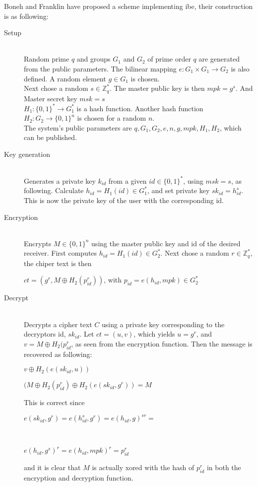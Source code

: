 Boneh and Franklin \cite{DBLP:ibe} have proposed a scheme implementing \gls{ibe}, their construction is as following:
\begin{description}
\item[ Setup ]\hfill \\  
Random prime $q$ and groups $G_1$ and $G_2$ of prime order $q$ are generated from the public parameters. The bilinear mapping $e: G_1 \times G_1 \rightarrow G_2$ is also defined. A random element $g \in G_1$ is chosen.\\
Next chose a random $s \in \mathbb{Z}_q^*$. The master public key is then $mpk = g^s$. And Master secret key $msk = s$\\
$H_1 : \{0,1\}^* \rightarrow G_1^*$ is a hash function. Another hash function $H_2 : G_2 \rightarrow \{0,1\}^n$ is chosen for a random $n$.\\
The system's public parameters are $q,G_1,G_2,e,n,g,mpk,H_1,H_2$, which can be published.
\item[Key generation]\hfill \\
Generates a private key $k_{id}$ from a given $id \in \{0,1\}^*$, using $msk = s$, as following. Calculate $h_{id} = H_1(id) \in G_1^*$, and set private key $sk_{id} = h_{id}^s$. This is now the private key of the user with the corresponding id.
\item[Encryption]\hfill \\
Encrypts $M \in \{0,1\}^n$ using the master public key and id of the desired receiver. First computes $h_{id}=H_1(id) \in G_2^*$. Next chose a random $r \in \mathbb{Z}_q^*$, the chiper text is then \\
\centerline{$ct = (g^r, M \oplus H_2(p_{id}^r))$, with $p_{id} = e(h_{id}, mpk) \in G_2^*$}

\item[Decrypt]\hfill \\
Decrypts a cipher text $C$ using a private key corresponding to the decryptors id, $sk_{id}$. Let $ct = (u,v)$, which yields $u = g^r$, and $v = M \oplus H_2(p_{id}^r$, as seen from the encryption function. Then the message is recovered as following:\\
\centerline{$v \oplus H_2(e(sk_{id}, u))$}
\centerline{$(M \oplus H_2(p_{id}^r) \oplus H_2(e(sk_{id}, g^r)) = M$}

This is correct since \\ 
\centerline{ $e(sk_{id}, g^r) = e(h_{id}^s, g^r) = e(h_{id}, g)^{sr} =$ }\\
\centerline{$e(h_{id}, g^s)^r = e(h_{id}, mpk)^r = p_{id}^r$ }
and it is clear that $M$ is actually xored with the hash of $p_{id}^r$ in both the encryption and decryption function.

\end{description}

